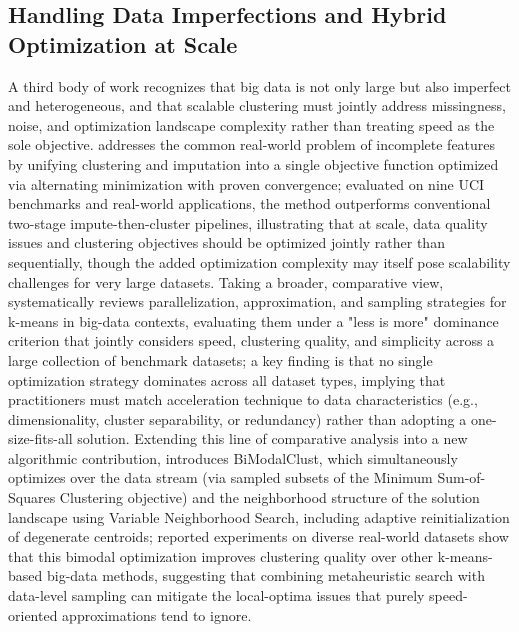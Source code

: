 \subsection{Handling Data Imperfections and Hybrid Optimization at Scale}
A third body of work recognizes that big data is not only large but also imperfect and heterogeneous, and that scalable clustering must jointly address missingness, noise, and optimization landscape complexity rather than treating speed as the sole objective. \cite{wang2019means} addresses the common real-world problem of incomplete features by unifying clustering and imputation into a single objective function optimized via alternating minimization with proven convergence; evaluated on nine UCI benchmarks and real-world applications, the method outperforms conventional two-stage impute-then-cluster pipelines, illustrating that at scale, data quality issues and clustering objectives should be optimized jointly rather than sequentially, though the added optimization complexity may itself pose scalability challenges for very large datasets. Taking a broader, comparative view, \cite{mussabayev2023comparative} systematically reviews parallelization, approximation, and sampling strategies for k-means in big-data contexts, evaluating them under a "less is more" dominance criterion that jointly considers speed, clustering quality, and simplicity across a large collection of benchmark datasets; a key finding is that no single optimization strategy dominates across all dataset types, implying that practitioners must match acceleration technique to data characteristics (e.g., dimensionality, cluster separability, or redundancy) rather than adopting a one-size-fits-all solution. Extending this line of comparative analysis into a new algorithmic contribution, \cite{mussabayev2025bimodalclust} introduces BiModalClust, which simultaneously optimizes over the data stream (via sampled subsets of the Minimum Sum-of-Squares Clustering objective) and the neighborhood structure of the solution landscape using Variable Neighborhood Search, including adaptive reinitialization of degenerate centroids; reported experiments on diverse real-world datasets show that this bimodal optimization improves clustering quality over other k-means-based big-data methods, suggesting that combining metaheuristic search with data-level sampling can mitigate the local-optima issues that purely speed-oriented approximations tend to ignore.

